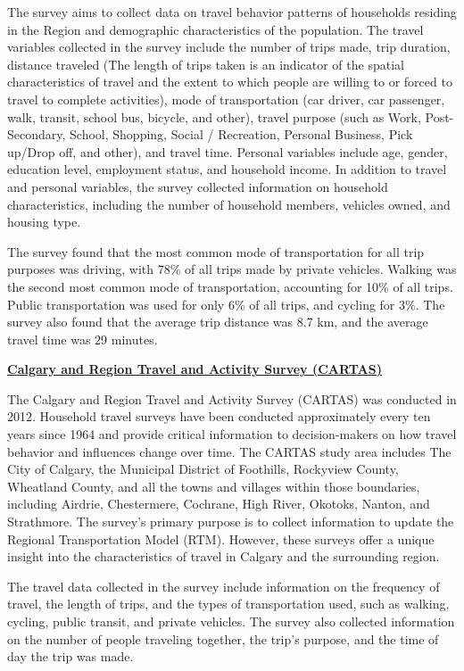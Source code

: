 \documentclass[12pt,twoside]{reedthesis}
\begin{document}
The survey aims to collect data on travel behavior patterns of households residing in the Region and demographic characteristics of the population. The travel variables collected in the survey include the number of trips made, trip duration, distance traveled (The length of trips taken is an indicator of the spatial characteristics of travel and the extent to which people are willing to or forced to travel to complete activities), mode of transportation (car driver, car passenger, walk, transit, school bus, bicycle, and other), travel purpose (such as Work, Post-Secondary, School, Shopping, Social / Recreation, Personal Business, Pick up/Drop off, and other), and travel time. Personal variables include age, gender, education level, employment status, and household income. In addition to travel and personal variables, the survey collected information on household characteristics, including the number of household members, vehicles owned, and housing type.

The survey found that the most common mode of transportation for all trip purposes was driving, with 78\% of all trips made by private vehicles. Walking was the second most common mode of transportation, accounting for 10\% of all trips. Public transportation was used for only 6\% of all trips, and cycling for 3\%. The survey also found that the average trip distance was 8.7 km, and the average travel time was 29 minutes.

\textbf{\href{https://www.calgary.ca/planning/transportation/surveys.html?redirect=/travelsurveys}{Calgary and Region Travel and Activity Survey (CARTAS)}}

The Calgary and Region Travel and Activity Survey (CARTAS) was conducted in 2012. Household travel surveys have been conducted approximately every ten years since 1964 and provide critical information to decision-makers on how travel behavior and influences change over time. The CARTAS study area includes The City of Calgary, the Municipal District of Foothills, Rockyview County, Wheatland County, and all the towns and villages within those boundaries, including Airdrie, Chestermere, Cochrane, High River, Okotoks, Nanton, and Strathmore. The survey's primary purpose is to collect information to update the Regional Transportation Model (RTM). However, these surveys offer a unique insight into the characteristics of travel in Calgary and the surrounding region.

The travel data collected in the survey include information on the frequency of travel, the length of trips, and the types of transportation used, such as walking, cycling, public transit, and private vehicles. The survey also collected information on the number of people traveling together, the trip's purpose, and the time of day the trip was made.
\end{document}
